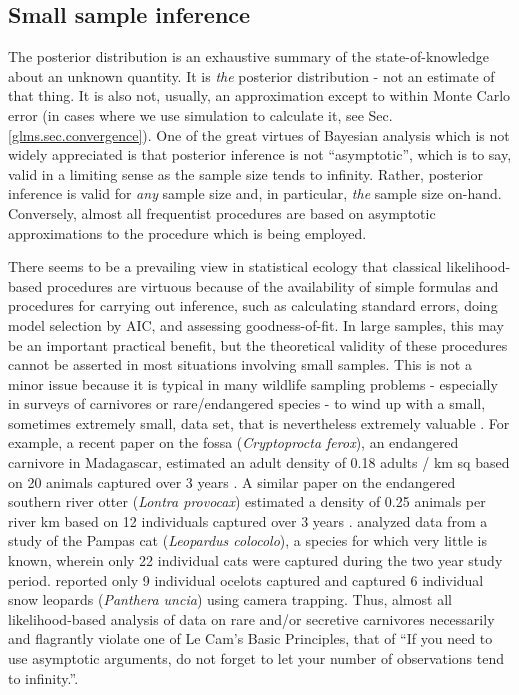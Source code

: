 \subsection{Small sample inference}

The posterior distribution is an exhaustive summary of the
state-of-knowledge about an unknown quantity. It is {\it the}
posterior distribution - not an estimate of that thing. It is also
not, usually, an approximation except to within Monte Carlo error (in
cases where we use simulation to calculate it, see
Sec. \ref{glms.sec.convergence}).  One of the great virtues of
Bayesian analysis which is not widely appreciated is that posterior
inference is not ``asymptotic'', which is to say, valid in a limiting
sense as the sample size tends to infinity. Rather, posterior
inference is valid for {\it any} sample size and, in particular, {\it
  the} sample size on-hand.  Conversely, almost all frequentist
procedures are based on asymptotic approximations to the procedure
which is being employed.

There seems to be a prevailing view in statistical ecology that
classical likelihood-based procedures are virtuous because of the
availability of simple formulas and procedures for carrying out
inference, such as calculating standard errors, doing model selection
by AIC, and assessing goodness-of-fit.  In large samples, this may be
an important practical benefit, but the theoretical validity of these
procedures cannot be asserted in most situations involving small
samples.  This is not a minor issue because it is typical in many
wildlife sampling problems - especially in surveys of carnivores or
rare/endangered species - to wind up with a small, sometimes extremely
small, data set, that is nevertheless extremely valuable \citep{foster_harmsen:2012}. For example, a recent paper on the fossa
(\emph{Cryptoprocta ferox}), an endangered carnivore in Madagascar, estimated
an adult density of 0.18 adults / km sq based on 20 animals captured
over 3 years \citep{hawkins_racey:2005}. A similar paper on the
endangered southern river otter (\emph{Lontra provocax}) estimated a density
of 0.25 animals per river km based on 12 individuals captured over 3
years \citep{sepulveda_etal:2007}. \citet{gardner_etal:2010ecol} analyzed
data from a study of the Pampas cat (\emph {Leopardus colocolo}), a species for which very little
is known, wherein only 22 individual cats were captured during the
two year study period.  \citet{trolle_kery:2005} reported only 9 individual
ocelots captured and \citet{jackson_etal:2006} captured 6 individual
snow leopards (\emph{Panthera uncia}) using camera trapping. Thus, almost all likelihood-based
analysis of data on rare and/or
secretive carnivores necessarily and flagrantly violate one of Le
Cam's Basic Principles, that of ``If you need to use asymptotic
arguments, do not forget to let your number of observations tend to
infinity.''\citep{lecam:1990}.

